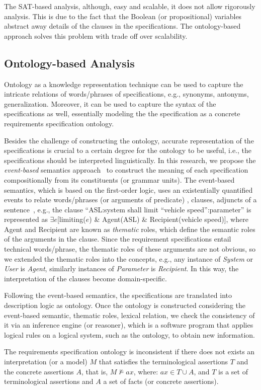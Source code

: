 The SAT-based analysis, although, easy and scalable, it does not allow rigorously analysis. This is due to the fact that the Boolean (or propositional) variables abstract away details of the clauses in the specifications. The ontology-based approach solves this problem with trade off over scalability.

\subsection*{Ontology-based Analysis}
Ontology as a knowledge representation technique can be used to capture the intricate relations of words/phrases of specifications, e.g., synonyms, antonyms, generalization. Moreover, it can be used to capture the syntax of the specifications as well, essentially modeling the the \resa{} specification as a concrete requirements specification ontology. 

Besides the challenge of constructing the ontology, accurate representation of the specifications is crucial to a certain degree for the ontology to be useful, i.e., the specifications should be interpreted linguistically. In this research, we propose the \textit{event-based} semantics approach~\cite{Mahmud2017SpecificationLogic} to construct the meaning of each specification compositionally from its constituents (or grammar units). The event-based semantics, which is based on the first-order logic, uses an existentially quantified events to relate words/phrases (or arguments of predicate) , clauses, adjuncts of a sentence~\cite{Mahmud2017SpecificationLogic}, e.g., the clause ``ASL:system shall limit ``vehicle speed'':parameter'' is represented as $\exists e$[limiting($e$) \& Agent(ASL) \& Recipient(vehicle speed)], where Agent and Recipient are known as \textit{thematic} roles, which define the semantic roles of the arguments in the clause.  Since the requirement specifications entail technical words/phrase, the thematic roles of these arguments are not obvious, so we extended the thematic roles into the \resa{} concepts, e.g., any instance of \textit{System} or \textit{User} is \textit{Agent}, similarly instances of \textit{Parameter} is \textit{Recipient}. In this way, the interpretation of the clauses become domain-specific.

Following the event-based semantics, the \resa{} specifications are translated into description logic as ontology. Once the ontology is constructed considering the event-based semantic, thematic roles, lexical relation, we check the consistency of it via an inference engine (or reasoner), which is a software program that applies logical rules on a logical system, such as the ontology, to obtain new information.
\begin{definition}
	The requirements specification ontology is inconsistent if there does not exists an interpretation (or a model) $M$ that satisfies the terminological assertions $T$ and the concrete assertions $A$, that is, $M \not\models ax$, where: $ax \in T \cup A$, and $T$ is a set of terminological assertions and $A$  a set of facts (or concrete assertions).
\end{definition}

